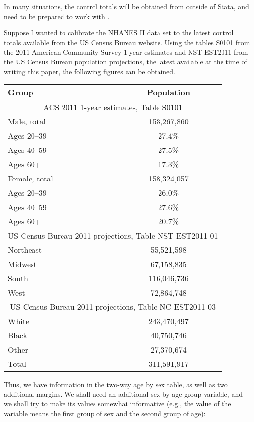 In many situations, the control totals will be obtained
from outside of Stata, and need to be prepared to work
with .

\begin{stexample}[Example 2]

Suppose I wanted to calibrate
the NHANES II data set to the latest control totals available
from the US Census Bureau website. Using the tables
S0101 from the 2011 American Community Survey 1-year estimates
and NST-EST2011 from the US Census Bureau population projections,
the latest available at the time of writing this paper,
the following figures can be obtained.

\begin{tabular}{lc}
    Group & Population \\
    \hline
    \multicolumn{2}{c}{ACS 2011 1-year estimates, Table S0101} \\
    Male, total & 153,267,860 \\
    Ages 20--39 & 27.4\% \\
    Ages 40--59 & 27.5\% \\
    Ages 60+    & 17.3\% \\
    Female, total & 158,324,057 \\
    Ages 20--39 & 26.0\% \\
    Ages 40--59 & 27.6\% \\
    Ages 60+    & 20.7\% \\
    \multicolumn{2}{c}{US Census Bureau 2011 projections, Table NST-EST2011-01} \\
    Northeast & 55,521,598 \\
    Midwest   & 67,158,835 \\
    South     & 116,046,736 \\
    West      & 72,864,748 \\
    \multicolumn{2}{c}{US Census Bureau 2011 projections, Table NC-EST2011-03} \\
    White     & 243,470,497 \\
    Black     & 40,750,746 \\
    Other     & 27,370,674 \\
    \hline
    Total     & 311,591,917
\end{tabular}

Thus, we have information in the two-way age by sex table, as well
as two additional margins. We shall need an additional sex-by-age group variable,
and we shall try to make its values somewhat informative
(e.g., the value  of the variable  means
the first group of sex and the second group of age):


\end{stexample}

